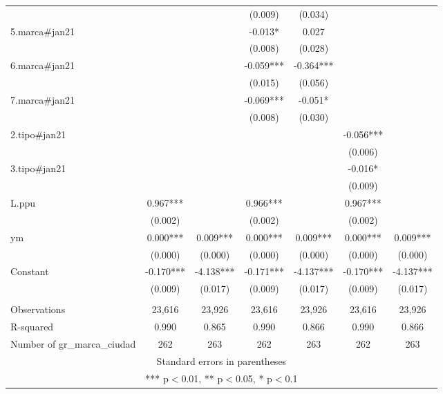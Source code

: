 \begin{tabular}{lcccccc}
 &  &  & (0.009) & (0.034) &  &  \\
5.marca\#jan21 &  &  & -0.013* & 0.027 &  &  \\
 &  &  & (0.008) & (0.028) &  &  \\
6.marca\#jan21 &  &  & -0.059*** & -0.364*** &  &  \\
 &  &  & (0.015) & (0.056) &  &  \\
7.marca\#jan21 &  &  & -0.069*** & -0.051* &  &  \\
 &  &  & (0.008) & (0.030) &  &  \\
2.tipo\#jan21 &  &  &  &  & -0.056*** &  \\
 &  &  &  &  & (0.006) &  \\
3.tipo\#jan21 &  &  &  &  & -0.016* &  \\
 &  &  &  &  & (0.009) &  \\
L.ppu & 0.967*** &  & 0.966*** &  & 0.967*** &  \\
& (0.002) &  & (0.002) &  & (0.002) &  \\
ym & 0.000*** & 0.009*** & 0.000*** & 0.009*** & 0.000*** & 0.009*** \\
& (0.000) & (0.000) & (0.000) & (0.000) & (0.000) & (0.000) \\
Constant & -0.170*** & -4.138*** & -0.171*** & -4.137*** & -0.170*** & -4.137*** \\
 & (0.009) & (0.017) & (0.009) & (0.017) & (0.009) & (0.017) \\
 &  &  &  &  &  &  \\
Observations & 23,616 & 23,926 & 23,616 & 23,926 & 23,616 & 23,926 \\
R-squared & 0.990 & 0.865 & 0.990 & 0.866 & 0.990 & 0.866 \\
 Number of gr\_marca\_ciudad & 262 & 263 & 262 & 263 & 262 & 263 \\ \hline
\multicolumn{7}{c}{ Standard errors in parentheses} \\
\multicolumn{7}{c}{ *** p$<$0.01, ** p$<$0.05, * p$<$0.1} \\
\end{tabular}

